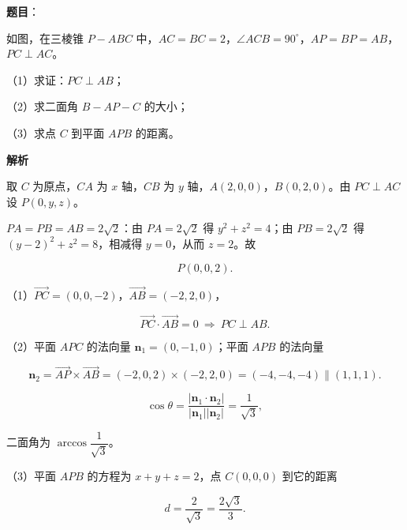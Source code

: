 \begin{answer}

\textbf{题目}：

如图，在三棱锥 $P-ABC$ 中，$AC=BC=2$，$\angle ACB=90^\circ$，$AP=BP=AB$，$PC\perp AC$。

（1）求证：$PC\perp AB$；

（2）求二面角 $B-AP-C$ 的大小；

（3）求点 $C$ 到平面 $APB$ 的距离。
\nopagebreak[4]
\begin{center}\end{center}
\nopagebreak[4]
\textbf{解析}

取 $C$ 为原点，$CA$ 为 $x$ 轴，$CB$ 为 $y$ 轴，$A(2,0,0)$，$B(0,2,0)$。由 $PC\perp AC$ 设 $P(0,y,z)$。

$PA=PB=AB=2\sqrt2$：由 $PA=2\sqrt2$ 得 $y^2+z^2=4$；由 $PB=2\sqrt2$ 得 $(y-2)^2+z^2=8$，相减得 $y=0$，从而 $z=2$。故

\nopagebreak[4]
\[P(0,0,2).\]

（1）$\overrightarrow{PC}=(0,0,-2)$，$\overrightarrow{AB}=(-2,2,0)$，

\nopagebreak[4]
\[\overrightarrow{PC}\cdot\overrightarrow{AB}=0\ \Longrightarrow\ PC\perp AB.\]

（2）平面 $APC$ 的法向量 $\boldsymbol n_1=(0,-1,0)$；平面 $APB$ 的法向量

\nopagebreak[4]
\[\boldsymbol n_2=\overrightarrow{AP}\times\overrightarrow{AB}=(-2,0,2)\times(-2,2,0)=(-4,-4,-4)\parallel(1,1,1).\]

\nopagebreak[4]
\[\cos\theta=\frac{\left|\boldsymbol n_1\cdot\boldsymbol n_2\right|}{\left|\boldsymbol n_1\right|\left|\boldsymbol n_2\right|}=\frac1{\sqrt3},\]

二面角为 $\arccos\dfrac1{\sqrt3}$。

（3）平面 $APB$ 的方程为 $x+y+z=2$，点 $C(0,0,0)$ 到它的距离

\nopagebreak[4]
\[d=\frac{2}{\sqrt3}=\frac{2\sqrt3}3.\]


\end{answer}
